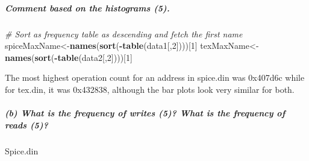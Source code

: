 \documentclass[
]{article}
\newenvironment{Shaded}{\begin{snugshade}}{\end{snugshade}}
\newcommand{\CommentTok}[1]{\textcolor[rgb]{0.56,0.35,0.01}{\textit{#1}}}
\newcommand{\DataTypeTok}[1]{\textcolor[rgb]{0.13,0.29,0.53}{#1}}
\newcommand{\DecValTok}[1]{\textcolor[rgb]{0.00,0.00,0.81}{#1}}
\newcommand{\KeywordTok}[1]{\textcolor[rgb]{0.13,0.29,0.53}{\textbf{#1}}}
\newcommand{\NormalTok}[1]{#1}
\newcommand{\OperatorTok}[1]{\textcolor[rgb]{0.81,0.36,0.00}{\textbf{#1}}}
\newcommand{\StringTok}[1]{\textcolor[rgb]{0.31,0.60,0.02}{#1}}
\begin{document}
\hypertarget{comment-based-on-the-histograms-5.}{%
\subparagraph{Comment based on the histograms
(5).}\label{comment-based-on-the-histograms-5.}}

\begin{Shaded}
\begin{Highlighting}[]
\CommentTok{# Sort as frequency table as descending and fetch the first name}
\NormalTok{spiceMaxName<-}\KeywordTok{names}\NormalTok{(}\KeywordTok{sort}\NormalTok{(}\OperatorTok{-}\KeywordTok{table}\NormalTok{(data1[,}\DecValTok{2}\NormalTok{])))[}\DecValTok{1}\NormalTok{]}
\NormalTok{texMaxName<-}\KeywordTok{names}\NormalTok{(}\KeywordTok{sort}\NormalTok{(}\OperatorTok{-}\KeywordTok{table}\NormalTok{(data2[,}\DecValTok{2}\NormalTok{])))[}\DecValTok{1}\NormalTok{]}
\end{Highlighting}
\end{Shaded}

The most highest operation count for an address in spice.din was
0x407d6c while for tex.din, it was 0x432838, although the bar plots look
very similar for both.

\hypertarget{b-what-is-the-frequency-of-writes-5-what-is-the-frequency-of-reads-5}{%
\subparagraph{(b) What is the frequency of writes (5)? What is the
frequency of reads
(5)?}\label{b-what-is-the-frequency-of-writes-5-what-is-the-frequency-of-reads-5}}

Spice.din

\begin{Shaded}
\end{Shaded}
\end{document}
